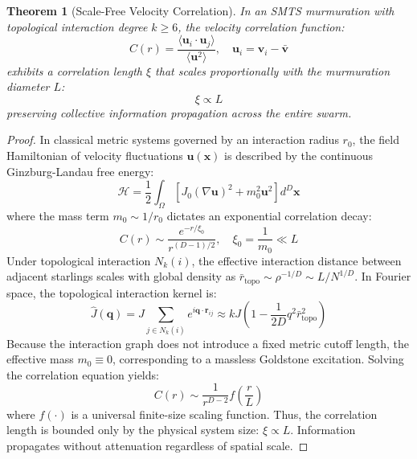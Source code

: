\documentclass[journal]{IEEEtran}
\newtheorem{theorem}{Theorem}
\begin{document}
\begin{theorem}[Scale-Free Velocity Correlation]
\label{thm:scalefree}
In an SMTS murmuration with topological interaction degree $k \ge 6$, the velocity correlation function:
\begin{equation}
C(r) = \frac{\langle \mathbf{u}_i \cdot \mathbf{u}_j \rangle}{\langle \mathbf{u}^2 \rangle}, \quad \mathbf{u}_i = \mathbf{v}_i - \bar{\mathbf{v}}
\end{equation}
exhibits a correlation length $\xi$ that scales proportionally with the murmuration diameter $L$:
\begin{equation}
\xi \propto L
\end{equation}
preserving collective information propagation across the entire swarm.
\end{theorem}
\begin{proof}
In classical metric systems governed by an interaction radius $r_0$, the field Hamiltonian of velocity fluctuations $\mathbf{u}(\mathbf{x})$ is described by the continuous Ginzburg-Landau free energy:
\begin{equation}
\mathcal{H} = \frac{1}{2} \int_{\Omega} \left[ J_0 (\nabla \mathbf{u})^2 + m_0^2 \mathbf{u}^2 \right] d^D \mathbf{x}
\end{equation}
where the mass term $m_0 \sim 1/r_0$ dictates an exponential correlation decay:
\begin{equation}
C(r) \sim \frac{e^{-r/\xi_0}}{r^{(D-1)/2}}, \quad \xi_0 = \frac{1}{m_0} \ll L
\end{equation}
Under topological interaction $N_k(i)$, the effective interaction distance between adjacent starlings scales with global density as $\bar{r}_{\text{topo}} \sim \rho^{-1/D} \sim L / N^{1/D}$. In Fourier space, the topological interaction kernel is:
\begin{equation}
\hat{J}(\mathbf{q}) = J \sum_{j \in N_k(i)} e^{i \mathbf{q} \cdot \mathbf{r}_{ij}} \approx k J \left( 1 - \frac{1}{2D} q^2 \bar{r}_{\text{topo}}^2 \right)
\end{equation}
Because the interaction graph does not introduce a fixed metric cutoff length, the effective mass $m_0 \equiv 0$, corresponding to a massless Goldstone excitation. Solving the correlation equation yields:
\begin{equation}
C(r) \sim \frac{1}{r^{D-2}} f\left(\frac{r}{L}\right)
\end{equation}
where $f(\cdot)$ is a universal finite-size scaling function. Thus, the correlation length is bounded only by the physical system size: $\xi \propto L$. Information propagates without attenuation regardless of spatial scale.
\end{proof}
\end{document}
